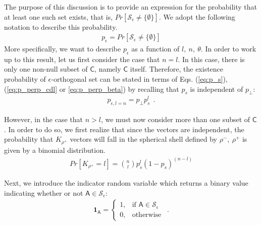 The purpose of this discussion is to provide an expression for the probability that at least one such set exists, that is, $Pr[\mathscr{S}_\epsilon \neq \lbrace \emptyset \rbrace]$. We adopt the following notation to describe this probability.
 \begin{equation}\label{eq:p_epsilon}
    \begin{aligned}
        p_\epsilon = Pr[\mathscr{S}_\epsilon \neq \lbrace \emptyset \rbrace]
    \end{aligned}
\end{equation}
More specifically, we want to describe $p_\epsilon$ as a function of $l,\ n,\ \theta$. In order to work up to this result, let us first consider the case that $n=l$. In this case, there is only one non-null subset of $\mathsf{C}$, namely $\mathsf{C}$ itself. Therefore, the existence probability of $\epsilon$-orthogonal set can be stated in terms of Eqs. (\ref{eq:p_s}), (\ref{eq:p_perp_cdl} or \ref{eq:p_perp_beta}) by recalling that $p_s$ is independent of $p_\perp$:
 \begin{equation}\label{eq:p_epsilon_l}
    \begin{aligned}
        p_{\epsilon,l=n} = p_\perp p_s^l \ \ .
    \end{aligned}
\end{equation}

However, in the case that $n>l$, we must now consider more than one subset of $\mathsf{C}$. In order to do so, we first realize that since the vectors are independent, the probability that $K_{\rho^+}$ vectors will fall in the spherical shell defined by $\rho^-,\ \rho^+$ is given by a binomial distribution.
 \begin{equation}\label{eq:K_rho}
    \begin{aligned}
        Pr[K_{\rho^+} = l] = \binom{n}{l}p_s^l(1-p_s)^{(n-l)}
    \end{aligned}
\end{equation}

Next, we introduce the indicator random variable which returns a binary value indicating whether or not $\mathsf{A}\in \mathscr{S}_\epsilon$:
 \begin{equation}\label{eq:orth_indicator}
    \begin{aligned}
        \textbf{1}_{\mathsf{A}} = 
        \begin{cases}
            1,& \text{if } \mathsf{A} \in \mathscr{S}_\epsilon\\
            0,              & \text{otherwise}
        \end{cases} \ \ .
    \end{aligned}
\end{equation}

